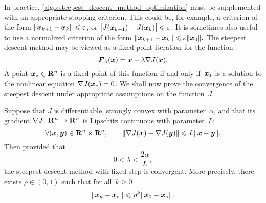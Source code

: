 In practice, \cref{algo:steepest_descent_method_optimization} must be supplemented with an appropriate stopping criterion.
This could be, for example, a criterion of the form $\lVert\mathbf{\boldsymbol{x}}_{k+1} - \mathbf{\boldsymbol{x}}_k\rVert \leqslant \varepsilon$,
or $\bigl\lvert J(\mathbf{\boldsymbol{x}}_{k+1}) - J(\mathbf{\boldsymbol{x}}_k) \bigr\rvert \leqslant \varepsilon$.
It is sometimes also useful to use a normalized criterion of the form $\lVert\mathbf{\boldsymbol{x}}_{k+1} - \mathbf{\boldsymbol{x}}_k\rVert \leqslant \varepsilon \lVert\mathbf{\boldsymbol{x}}_0\rVert.$
The steepest descent method may be viewed as a fixed point iteration for the function
\begin{equation}
    \label{eq:fixed_point_gradient_descent}
    \mathbf{\boldsymbol{F}}_{\lambda}(\mathbf{\boldsymbol{x}}) = \mathbf{\boldsymbol{x}} - \lambda \nabla J(\mathbf{\boldsymbol{x}}).
\end{equation}
A point $\mathbf{\boldsymbol{x}}_* \in \mathbf R^n$ is a fixed point of this function if and only if~$\mathbf{\boldsymbol{x}}_*$ is a solution to the nonlinear equation $\nabla J(\mathbf{\boldsymbol{x}}_*) = 0$.
We shall now prove the convergence of the steepest descent under appropriate assumptions on the function~$J$.
\begin{theorem}
    \label{theorem:convergence_steepest_descent_optimization}
    Suppose that $J$ is differentiable, strongly convex with parameter~$\alpha$,
    and that its gradient $\nabla J \colon \mathbf R^n \to \mathbf R^n$ is Lipschitz continuous with parameter~$L$:
    \begin{equation}
        \label{eq:lipschitz_gradient}
        \forall (\mathbf{\boldsymbol{x}}, \mathbf{\boldsymbol{y}}) \in \mathbf R^n \times \mathbf R^n, \qquad
        \lVert\nabla J(\mathbf{\boldsymbol{x}}) - \nabla J(\mathbf{\boldsymbol{y}})\rVert \leqslant L \lVert\mathbf{\boldsymbol{x}} - \mathbf{\boldsymbol{y}}\rVert.
    \end{equation}
    Then provided that
    \begin{equation}
        \label{eq:condition_time_step}
        0 < \lambda < \frac{2 \alpha}{L},
    \end{equation}
    the steepest descent method with fixed step is convergent.
    More precisely,
    there exists $\rho \in (0, 1)$ such that for all~$k \geq 0$
    \begin{equation}
        \label{eq:exponential_convergence}
        \lVert\mathbf{\boldsymbol{x}}_k - \mathbf{\boldsymbol{x}}_*\rVert \leqslant \rho^k \lVert\mathbf{\boldsymbol{x}}_0 - \mathbf{\boldsymbol{x}}_*\rVert.
    \end{equation}
\end{theorem}
